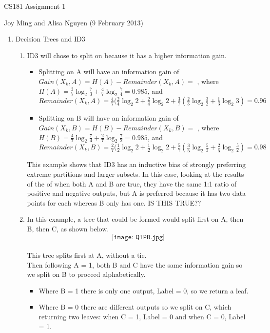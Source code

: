 \documentclass[11pt]{article}
\begin{document}
\begin{center}
\large
CS181 Assignment 1
\end{center}
Joy Ming and Alisa Nguyen (9 February 2013)\\

\begin{enumerate}
\setcounter{enumi}{0}

\item Decision Trees and ID3
\begin{enumerate}
\item ID3 will chose to split on  because it has a higher information gain.
	\begin{itemize}
	\item Splitting on A will have an information gain of $Gain(X_k,A)=H(A)-Remainder(X_k,A)=$ , 
		where $H(A) = \frac{3}{7}\log_2 \frac{7}{3} + \frac{4}{7}\log_2\frac{7}{4}=0.985$, %
		and $Remainder(X_k,A)=\frac{4}{7}(\frac{2}{4}\log_2 2+\frac{2}{4}\log_2 2+\frac{3}{7}(\frac{2}{3}\log_2 \frac{3}{2} + \frac{1}{3}\log_2 3) = 0.96$
	\item Splitting on B will have an information gain of $Gain(X_k,B)=H(B)-Remainder(X_k,B)=$ , 
		where $H(B) = \frac{4}{7}\log_2 \frac{7}{4} + \frac{2}{7}\log_2\frac{7}{2}=0.985$, %
		and $Remainder(X_k,B)=\frac{2}{7}(\frac{1}{2}\log_2 2+\frac{1}{2}\log_2 2+\frac{5}{7}(\frac{3}{5}\log_2 \frac{5}{3} + \frac{2}{5}\log_2 \frac{5}{2})=0.98$
	\end{itemize}
This example shows that ID3 has an inductive bias of strongly preferring extreme partitions and larger subsets. In this case, looking at the results of the of when both A and B are true, they have the same 1:1 ratio of positive and negative outputs, but A is preferred because it has two data points for each whereas B only has one. IS THIS TRUE??
\item In this example, a tree that could be formed would split first on A, then B, then C, as shown below.\\
	$$\texttt{[image: Q1PB.jpg]}$$
	\\This tree splits first at A, without a tie.
	\\ Then following A = 1, both B and C have the same information gain so we split on B to proceed alphabetically. 
	\begin{itemize}
	\item Where B = 1 there is only one output, Label = 0, so we return a leaf.  
	\item Where B = 0 there are different outputs so we split on C, which returning two leaves: when C = 1, Label = 0 and when C = 0, Label = 1. 

\end{itemize}
\end{enumerate}
\end{enumerate}
\end{document}
